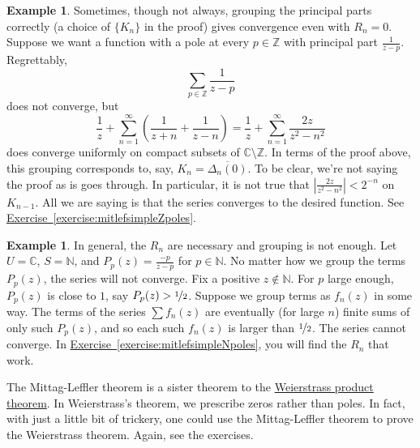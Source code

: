 \documentclass[12pt,openany]{book}
\newcommand{\abs}[1]{\left\lvert {#1} \right\rvert}
\newcommand{\C}{{\mathbb{C}}}
\newcommand{\Z}{{\mathbb{Z}}}
\newcommand{\N}{{\mathbb{N}}}
\theoremstyle{plain}
\theoremstyle{remark}
\theoremstyle{definition}
\theoremstyle{exercise}
\theoremstyle{example}
\newtheorem{example}[thm]{Example}
\newcommand{\exerciseref}[1]{\hyperref[#1]{Exercise~\ref*{#1}}}
\begin{document}
\begin{example} \label{example:mitlefsimpleZpoles}
Sometimes, though not always,
grouping the principal parts correctly
(a choice of $\{ K_n \}$ in the proof)
gives convergence even with $R_n=0$.
Suppose we want a function with a pole at every $p \in \Z$ with
principal part $\frac{1}{z-p}$.  Regrettably,
\begin{equation*}
\sum_{p\in \Z} \frac{1}{z-p}
\end{equation*}
does not converge, but
\begin{equation*}
\frac{1}{z} + 
\sum_{n=1}^\infty
\left(
\frac{1}{z+n} + 
\frac{1}{z-n}
\right)
=
\frac{1}{z}
+
\sum_{n=1}^\infty
\frac{2z}{z^2-n^2}
\end{equation*}
does converge uniformly on compact subsets of $\C \setminus \Z$.
In terms of the proof above, this grouping corresponds to, say,
$K_n = \overline{\Delta_n(0)}$.
To be clear, we're not saying the proof as is goes
through.  In particular, it is not true that
$\abs{\frac{2z}{z^2-n^2}} < 2^{-n}$ on $K_{n-1}$.
All we are saying is
that the series converges to the desired function.
See \exerciseref{exercise:mitlefsimpleZpoles}.
\end{example}

\begin{example}
In general, the $R_n$ are necessary and grouping is not enough.
Let $U = \C$, $S = \N$, and $P_p(z) = \frac{-p}{z-p}$ for $p \in \N$.
No matter how we group the terms $P_p(z)$,
the series will not converge.
Fix a positive $z \notin \N$.
For $p$ large enough,
$P_p(z)$ is close to $1$, say $P_p(z) > \nicefrac{1}{2}$.
Suppose we group terms as $f_n(z)$ in some way.
The terms of the series $\sum f_n(z)$
are eventually (for large $n$)
finite sums of only such $P_p(z)$,
and so each such $f_n(z)$ is larger than $\nicefrac{1}{2}$.
The series cannot converge.
In \exerciseref{exercise:mitlefsimpleNpoles}, you will find
the $R_n$ that work.
\end{example}

The Mittag-Leffler theorem is a sister theorem to
the
\hyperref[thm:weierprod]{Weierstrass product theorem}.
In Weierstrass's theorem,
we prescribe zeros rather than poles.  In fact, with just a little bit
of trickery, one could use the Mittag-Leffler theorem to prove
the Weierstrass theorem.  Again, see the exercises.
\end{document}
